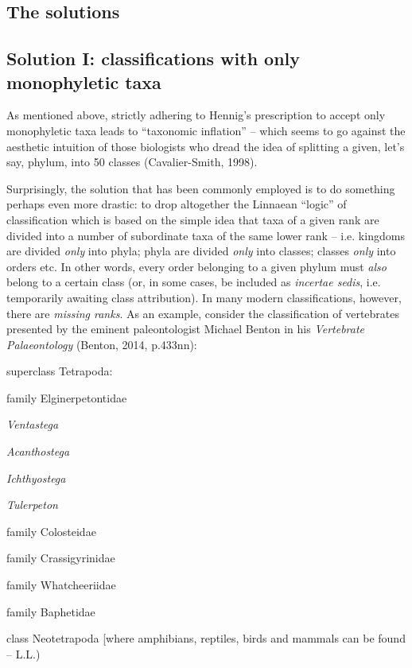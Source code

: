\begin{artengenv}
\section{The solutions}

\subsection{Solution I: classifications with only monophyletic taxa}

As mentioned above, strictly adhering to Hennig’s prescription to accept only monophyletic taxa leads to “taxonomic
inflation” – which seems to go against the aesthetic intuition of those biologists who dread the idea of splitting a
given, let’s say, phylum, into 50 classes \label{ref:RNDsx8NDQDrK2}(Cavalier-Smith, 1998).

Surprisingly, the solution that has been commonly employed is to do something perhaps even more drastic: to drop
altogether the Linnaean “logic” of classification which is based on the simple idea that taxa of a given rank are
divided into a number of subordinate taxa of the same lower rank – i.e. kingdoms are divided \textit{only} into phyla;
phyla are divided \textit{only} into classes; classes \textit{only} into orders etc. In other words, every order
belonging to a given phylum must \textit{also }belong to a certain class (or, in some cases, be included as
\textit{incertae sedis}, i.e. temporarily awaiting class attribution). In many modern classifications, however, there
are \textit{missing ranks}. As an example, consider the classification of vertebrates presented by the eminent
paleontologist Michael Benton in his \textit{Vertebrate Palaeontology} \label{ref:RNDqnkTfPlTq8}(Benton, 2014,
p.433nn):

 superclass Tetrapoda:

 {\BigCircle} family Elginerpetontidae

 {\BigCircle} \textit{Ventastega}

 {\BigCircle} \textit{Acanthostega}

 {\BigCircle} \textit{Ichthyostega}

 {\BigCircle} \textit{Tulerpeton}

 {\BigCircle} family Colosteidae

 {\BigCircle} family Crassigyrinidae

 {\BigCircle} family Whatcheeriidae

 {\BigCircle} family Baphetidae

 {\BigCircle} class Neotetrapoda [where amphibians, reptiles, birds and mammals can be found – L.L.)


\end{artengenv}
